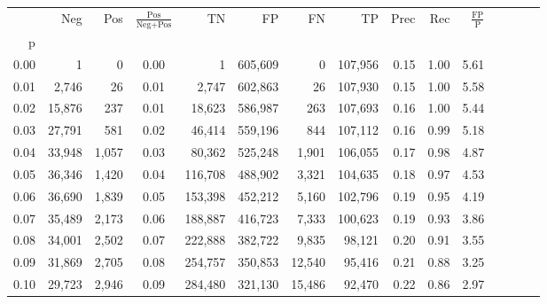 \begin{tabular}{rrrcrrrrrrrrrrr}
\toprule
{} &     Neg &    Pos & $\frac{\text{Pos}}{\text{Neg}+\text{Pos}}$ &       TN &       FP &       FN &       TP &  Prec &   Rec & $\frac{\text{FP}}{\text{P}}$ \\
p    &         &        &                                            &          &          &          &          &       &       &                              \\
\midrule
0.00 &       1 &      0 &                                       0.00 &        1 &  605,609 &        0 &  107,956 &  0.15 &  1.00 &                         5.61 \\
0.01 &   2,746 &     26 &                                       0.01 &    2,747 &  602,863 &       26 &  107,930 &  0.15 &  1.00 &                         5.58 \\
0.02 &  15,876 &    237 &                                       0.01 &   18,623 &  586,987 &      263 &  107,693 &  0.16 &  1.00 &                         5.44 \\
0.03 &  27,791 &    581 &                                       0.02 &   46,414 &  559,196 &      844 &  107,112 &  0.16 &  0.99 &                         5.18 \\
0.04 &  33,948 &  1,057 &                                       0.03 &   80,362 &  525,248 &    1,901 &  106,055 &  0.17 &  0.98 &                         4.87 \\
0.05 &  36,346 &  1,420 &                                       0.04 &  116,708 &  488,902 &    3,321 &  104,635 &  0.18 &  0.97 &                         4.53 \\
0.06 &  36,690 &  1,839 &                                       0.05 &  153,398 &  452,212 &    5,160 &  102,796 &  0.19 &  0.95 &                         4.19 \\
0.07 &  35,489 &  2,173 &                                       0.06 &  188,887 &  416,723 &    7,333 &  100,623 &  0.19 &  0.93 &                         3.86 \\
0.08 &  34,001 &  2,502 &                                       0.07 &  222,888 &  382,722 &    9,835 &   98,121 &  0.20 &  0.91 &                         3.55 \\
0.09 &  31,869 &  2,705 &                                       0.08 &  254,757 &  350,853 &   12,540 &   95,416 &  0.21 &  0.88 &                         3.25 \\
0.10 &  29,723 &  2,946 &                                       0.09 &  284,480 &  321,130 &   15,486 &   92,470 &  0.22 &  0.86 &                         2.97 \\

\end{tabular}
